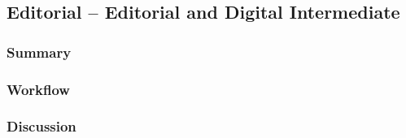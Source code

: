 \subsection{Editorial -- Editorial and Digital Intermediate} \label{subsec:ff-editorial}

	\subsubsection{Summary}
	
	\lipsum[1] %
	
	\subsubsection{Workflow}
	
	\lipsum[1] %
	
	\subsubsection{Discussion}
	
	\lipsum[1] %
	